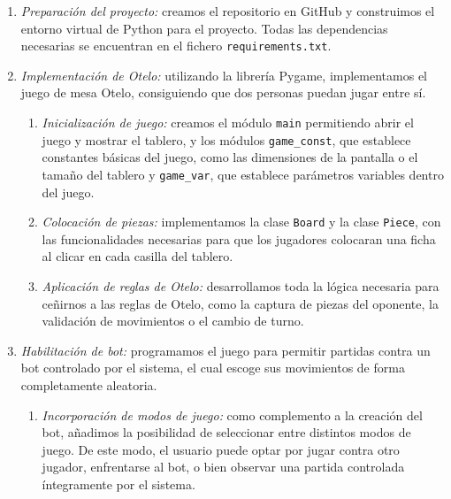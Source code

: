 \documentclass[conference,a4paper]{IEEEtran}
\begin{document}
\begin{enumerate}
\item \textit{Preparación del proyecto:} creamos el repositorio
  en GitHub y construimos el entorno virtual de Python para el proyecto.
  Todas las dependencias necesarias se encuentran en el fichero
  \texttt{requirements.txt}.
\item \textit{Implementación de Otelo:} utilizando la librería Pygame,
  implementamos el juego de mesa Otelo, consiguiendo que dos personas
  puedan jugar entre sí.
  \begin{enumerate}
  \item \textit{Inicialización de juego:} creamos el módulo \texttt{main} 
    permitiendo abrir el juego y mostrar el tablero, y los módulos \texttt{game\_const},
    que establece constantes básicas del juego, como las dimensiones de la pantalla o 
    el tamaño del tablero y \texttt{game\_var}, que establece parámetros variables dentro
    del juego.
  \item \textit{Colocación de piezas:} implementamos la clase \texttt{Board}
    y la clase \texttt{Piece}, con las funcionalidades necesarias para que los jugadores
    colocaran una ficha al clicar en cada casilla del tablero.
  \item \textit{Aplicación de reglas de Otelo:} desarrollamos toda la lógica necesaria
    para ceñirnos a las reglas de Otelo, como la captura de piezas del oponente,
    la validación de movimientos o el cambio de turno.
  \end{enumerate} 
\item  \textit{Habilitación de bot:} programamos el juego para permitir partidas contra un
 bot controlado por el sistema, el cual escoge sus movimientos de  forma completamente aleatoria.
  \begin{enumerate}
  \item \textit{Incorporación de modos de juego:} como complemento a la creación del bot,
  añadimos la posibilidad de seleccionar entre distintos modos de juego. 
  De este modo, el usuario puede optar por jugar contra otro jugador, enfrentarse al bot, 
  o bien observar una partida controlada íntegramente por el sistema.
  \end{enumerate}


\end{enumerate}
\end{document}

